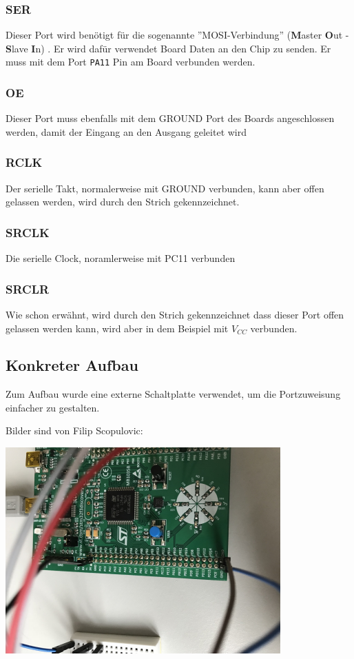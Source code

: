 \subsubsection{SER}
Dieser Port wird benötigt für die sogenannte ''MOSI-Verbindung'' (\textbf{M}aster \textbf{O}ut - \textbf{S}lave \textbf{I}n) . Er wird dafür verwendet Board Daten an den Chip zu senden. 
Er muss mit dem Port \verb|PA11| Pin am Board verbunden werden.

\subsubsection{OE}
Dieser Port muss ebenfalls mit dem GROUND Port des Boards angeschlossen werden, damit der Eingang an den Ausgang geleitet wird

\subsubsection{RCLK}
Der serielle Takt, normalerweise mit GROUND verbunden, kann aber offen gelassen werden, wird durch den Strich gekennzeichnet. 

\subsubsection{SRCLK}
Die serielle Clock, noramlerweise mit PC11 verbunden

\subsubsection{SRCLR}
Wie schon erwähnt, wird durch den Strich gekennzeichnet dass dieser Port offen gelassen werden kann, wird aber in dem Beispiel mit \(V_{CC}\) verbunden. 

\subsection{Konkreter Aufbau}
Zum Aufbau wurde eine externe Schaltplatte verwendet, um die Portzuweisung einfacher zu gestalten.

Bilder sind von Filip Scopulovic: 


\begin{minipage}{\linewidth}
	\centering
	\includegraphics[width=0.8\linewidth]{images/aufbau1}
\end{minipage}

